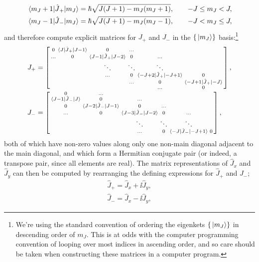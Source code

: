 \begin{align}
\matrixel{m_J + 1}{\hat J_+}{m_J} &= \hbar\sqrt{J(J + 1) - m_J(m_J + 1)}, \qquad -J \leq m_J < J,\\
\matrixel{m_J - 1}{\hat J_-}{m_J} &= \hbar\sqrt{J(J + 1) - m_J(m_J - 1)}, \qquad -J < m_J \leq J,
\end{align}
and therefore compute explicit matrices for $J_+$ and $J_-$ in the $\{\ket{m_J}\}$ basis:\footnote{We're using the standard convention of ordering the eigenkets $\{\ket{m_J}\}$ in descending order of $m_J$. This is at odds with the computer programming convention of looping over most indices in ascending order, and so care should be taken when constructing these matrices in a computer program.}
\begin{align}
J_+ &=
\left[\begin{smallmatrix}
0 &  \matrixel{J}{\hat J_+}{J - 1} & 0 & \hdots\\
\hdots & 0 & \matrixel{J - 1}{\hat J_+}{J - 2} & 0 & \hdots\\
& & \ddots & \ddots & \ddots\\
 & & \hdots & 0 & \matrixel{ -J + 2}{\hat J_+}{-J + 1} & 0\\
 & & & \hdots & 0 & \matrixel{ -J + 1}{\hat J_+}{-J}\\
 & & & & \hdots & 0\\
\end{smallmatrix} \right],\\
J_- &=
\left[\begin{smallmatrix}
    0 & \hdots \\
    \matrixel{J - 1}{\hat J_-}{J} & 0 & \hdots\\
    0 & \matrixel{J - 2}{\hat J_-}{J - 1} & 0 & \hdots\\
    \hdots & 0 & \matrixel{J - 3}{\hat J_-}{J - 2} & 0 & \hdots\\
    & & \ddots & \ddots & \ddots\\
    & & \hdots & 0 & \matrixel{-J}{\hat J_-}{-J + 1} & 0 \\
\end{smallmatrix} \right],
\end{align}
both of which have non-zero values along only one non-main diagonal adjacent to the main diagonal, and which form a Hermitian conjugate pair (or indeed, a transpose pair, since all elements are real). The matrix representations of $\hat J_x$ and $\hat J_y$ can then be computed by rearranging the defining expressions for $\hat J_+$ and $J_-$;
\begin{align}
\hat J_+ = \hat J_x + \ii \hat J_y,\\
\hat J_- = \hat J_x - \ii \hat J_y,
\end{align}
